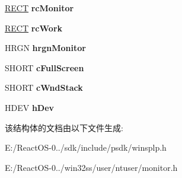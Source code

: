 \begin{DoxyCompactItemize}
\begin{tabbing}
\end{tabbing}\item 
\mbox{\label{struct___m_o_n_i_t_o_r_aa14e3701e74a4af52e8bee0f4637ff69}} 
\hyperlink{structtag_r_e_c_t}{R\+E\+CT} {\bfseries rc\+Monitor}
\item 
\mbox{\label{struct___m_o_n_i_t_o_r_a4cbaf6aa57e3f4ab4135da7181f9fe76}} 
\hyperlink{structtag_r_e_c_t}{R\+E\+CT} {\bfseries rc\+Work}
\item 
\mbox{\label{struct___m_o_n_i_t_o_r_aa4dffb64f9405d40b24b97fc8bd8fb7a}} 
H\+R\+GN {\bfseries hrgn\+Monitor}
\item 
\mbox{\label{struct___m_o_n_i_t_o_r_aac36db134d8d130065280123324c7936}} 
S\+H\+O\+RT {\bfseries c\+Full\+Screen}
\item 
\mbox{\label{struct___m_o_n_i_t_o_r_a02305e7e810194cbe9634fd2ef945106}} 
S\+H\+O\+RT {\bfseries c\+Wnd\+Stack}
\item 
\mbox{\label{struct___m_o_n_i_t_o_r_a86499316954e3d180d8e68248424616f}} 
H\+D\+EV {\bfseries h\+Dev}
\end{DoxyCompactItemize}


该结构体的文档由以下文件生成\+:\begin{DoxyCompactItemize}
\item 
E\+:/\+React\+O\+S-\/0../sdk/include/psdk/winsplp.\+h\item 
E\+:/\+React\+O\+S-\/0../win32ss/user/ntuser/monitor.\+h\end{DoxyCompactItemize}
